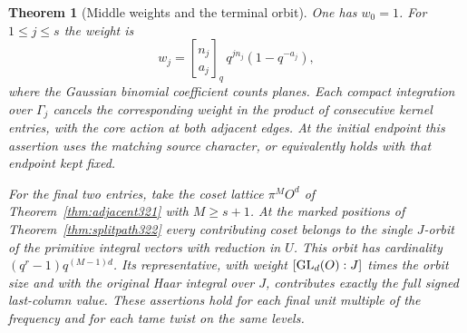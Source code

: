 \documentclass[a4paper,11pt]{article}
\newtheorem{theorem}[proposition]{Theorem}
\theoremstyle{definition}
\theoremstyle{remark}
\numberwithin{equation}{section}
\begin{document}
\begin{theorem}[Middle weights and the terminal orbit]\leavevmode
\label{thm:splitcompact323}
One has \(w_0=1\). For \(1\le j\le s\) the weight is
\[
  w_j={n_j\brack a_j}_q\,q^{j n_j}(1-q^{-a_j}),
\]
where the Gaussian binomial coefficient counts planes.
Each compact integration over \(\Gamma_j\) cancels the
corresponding weight in the product of consecutive kernel
entries, with the core action at both adjacent edges.
At the initial endpoint this assertion uses the matching
source character, or equivalently holds with that endpoint
kept fixed.

For the final two entries, take the coset lattice
\(\pi^M O^d\) of Theorem~\ref{thm:adjacent321} with
\(M\ge s+1\). At the marked positions of
Theorem~\ref{thm:splitpath322} every contributing coset
belongs to the single \(J\)-orbit of the primitive integral
vectors with reduction in \(U\). This orbit has cardinality
\((q^r-1)q^{(M-1)d}\). Its representative, with weight
\([{\rm GL}_d(O):J]\) times the orbit size and with the
original Haar integral over \(J\), contributes exactly the
full signed last-column value. These assertions hold for
each final unit multiple of the frequency and for each tame
twist on the same levels.
\end{theorem}
\end{document}
